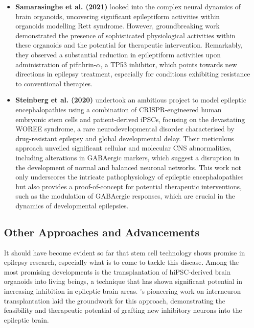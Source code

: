 \documentclass[10pt]{article}
\begin{document}
\begin{sloppypar}
  \vspace{0.5cm} %

  \begin{itemize}[leftmargin=*]
    \item \textbf{Samarasinghe et al. (2021)} looked into the complex neural dynamics of brain organoids, uncovering significant epileptiform activities within organoids modelling Rett syndrome. However, \citeauthor{samarasinghe_identification_2021} groundbreaking work demonstrated the presence of sophisticated physiological activities within these organoids and the potential for therapeutic intervention. Remarkably, they observed a substantial reduction in epileptiform activities upon administration of pifithrin-$\alpha$, a TP53 inhibitor, which points towards new directions in epilepsy treatment, especially for conditions exhibiting resistance to conventional therapies.

    \item \textbf{Steinberg et al. (2020)} undertook an ambitious project to model epileptic encephalopathies using a combination of CRISPR-engineered human embryonic stem cells and patient-derived iPSCs, focusing on the devastating WOREE syndrome, a rare neurodevelopmental disorder characterised by drug-resistant epilepsy and global developmental delay. Their meticulous approach unveiled significant cellular and molecular CNS abnormalities, including alterations in GABAergic markers, which suggest a disruption in the development of normal and balanced neuronal networks. This work not only underscores the intricate pathophysiology of epileptic encephalopathies but also provides a proof-of-concept for potential therapeutic interventions, such as the modulation of GABAergic responses, which are crucial in the dynamics of developmental epilepsies.
  \end{itemize}

  \subsection{Other Approaches and Advancements}
  \label{sec:other-approaches-and-advancements}

  It should have become evident so far that stem cell technology shows promise in epilepsy research, especially what is to come to tackle this disease. Among the most promising developments is the transplantation of hiPSC-derived brain organoids into living beings, a technique that has shown significant potential in increasing inhibition in epileptic brain areas. \citeauthor{hunt_interneuron_2015}’s \citeyearpar{hunt_interneuron_2015} pioneering work on interneuron transplantation laid the groundwork for this approach, demonstrating the feasibility and therapeutic potential of grafting new inhibitory neurons into the epileptic brain.


\end{sloppypar}
\end{document}
